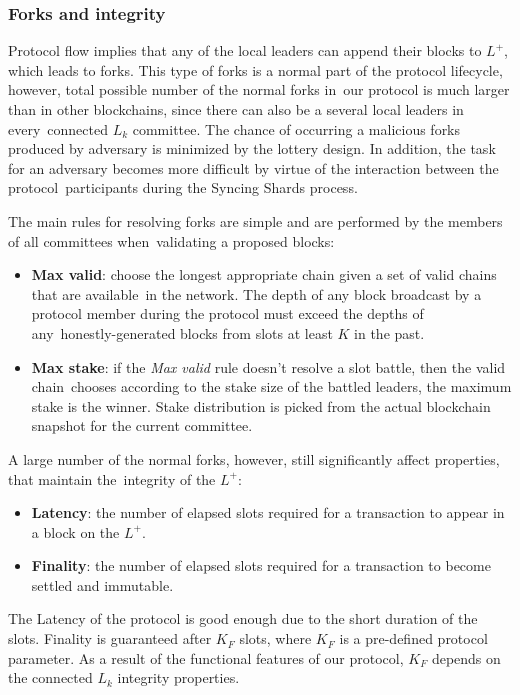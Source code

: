 \subsubsection{Forks and integrity}\label{subsubsec:resolving-forks}

Protocol flow implies that any of the local leaders can append their blocks to $L^+$, which leads to forks.
This type of forks is a normal part of the protocol lifecycle, however, total possible number of the normal forks in\
our protocol is much larger than in other blockchains, since there can also be a several local leaders in every\
connected $L_k$ committee.
The chance of occurring a malicious forks produced by adversary is minimized by the lottery design.
In addition, the task for an adversary becomes more difficult by virtue of the interaction between the protocol\
participants during the Syncing Shards process.

The main rules for resolving forks are simple and are performed by the members of all committees when\
validating a proposed blocks:
\begin{itemize}
    \item \textbf{Max valid}: choose the longest appropriate chain given a set of valid chains that are available\
    in the network.
    The depth of any block broadcast by a protocol member during the protocol must exceed the depths of any\
    honestly-generated blocks from slots at least $K$ in the past.
    \item \textbf{Max stake}: if the \emph{Max valid} rule doesn't resolve a slot battle, then the valid chain\
    chooses according to the stake size of the battled leaders, the maximum stake is the winner.
    Stake distribution is picked from the actual blockchain snapshot for the current committee.
\end{itemize}

A large number of the normal forks, however, still significantly affect properties, that maintain the\
integrity of the $L^+$:
\begin{itemize}
    \item \textbf{Latency}: the number of elapsed slots required for a transaction to appear in a block on the $L^+$.
    \item \textbf{Finality}: the number of elapsed slots required for a transaction to become settled and immutable.
\end{itemize}
The Latency of the protocol is good enough due to the short duration of the slots.
Finality is guaranteed after $K_F$ slots, where $K_F$ is a pre-defined protocol parameter.
As a result of the functional features of our protocol, $K_F$ depends on the connected $L_k$ integrity properties.


